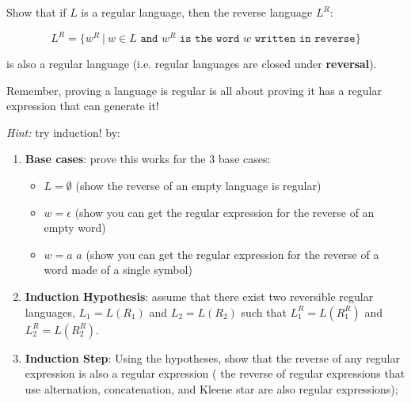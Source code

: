 \documentclass[12pt]{article}
\newenvironment{exercise}[2][Exercise]{\begin{trivlist}
\item[\hskip \labelsep {\bfseries #1}\hskip \labelsep {\bfseries #2.}]}{\end{trivlist}}
\newenvironment{solution}[1][{\color{red} Solution:}]{\begin{trivlist}
\item[\hskip \labelsep {\bfseries #1}\hskip \labelsep {\bfseries}]}{\end{trivlist}}
\begin{document}





\clearpage

\begin{exercise}{4}

Show that if $L$ is a regular language, then the reverse language $L^R$:

$$L^R = \{w^R \ | \ w\in L \texttt{ and } w^R \texttt{ is the word } w \texttt{ written in reverse}\}$$

is also a regular language (i.e. regular languages are closed under \textbf{reversal}).

Remember, proving a language is regular is all about proving it has a regular expression that can generate it!

{\Large \textit{Hint: }}
 try induction! by:
\begin{enumerate}
    \item \textbf{Base cases}: prove this works for the 3 base cases:
    \begin{itemize}
        \item $L =\emptyset$ (show the reverse of an empty language is regular)
        \item $w=\epsilon$ (show you can get the regular expression for the reverse of an empty word)
        \item $w=a$  $a$ (show you can get the regular expression for the reverse of a word made of a single symbol)
    \end{itemize}
    \item\textbf{ Induction Hypothesis}: assume that there exist two reversible regular languages, $L_1 = L(R_1)$ and $L_2 = L(R_2)$ such that $L^R_1 = L(R^R_1)$ and $L^R_2 = L(R^R_2)$.

    \item \textbf{Induction Step}: Using the hypotheses, show that the reverse of any regular expression is also a regular expression (
    the reverse of regular expressions that use alternation, concatenation, and Kleene star are also regular expressions); 
\end{enumerate}

\end{exercise}
\end{document}

